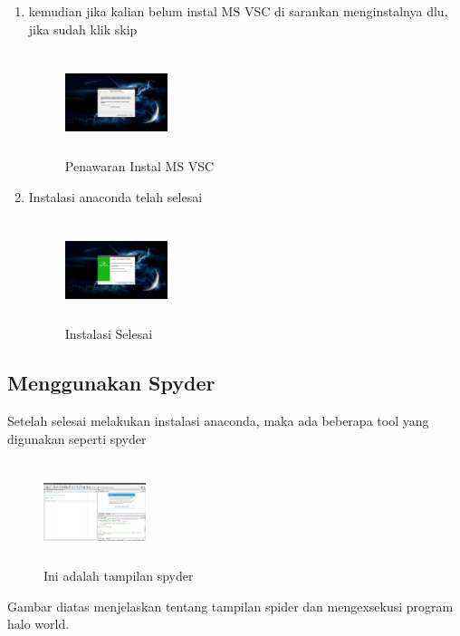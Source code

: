 \begin{enumerate}
    \item kemudian jika kalian belum instal MS VSC di sarankan menginstalnya dlu, jika sudah klik skip
    \begin{figure}[!htbp]
        \centering
        \includegraphics[width=3cm,height=3cm]{figures/Screenshot(87).png}
        \caption{Penawaran Instal MS VSC}
        \label{offering}
        \end{figure}

    \item Instalasi anaconda telah selesai
    \begin{figure}[!htbp]
        \centering
        \includegraphics[width=3cm,height=3cm]{figures/Screenshot(88).png}
        \caption{Instalasi Selesai}
        \label{akhir}
        \end{figure}
\end{enumerate}
\subsection{Menggunakan Spyder}
Setelah selesai melakukan instalasi anaconda, maka ada beberapa tool yang digunakan seperti spyder

\begin{figure}[!htbp]
    \centering
    \includegraphics[width=3cm,height=3cm]{figures/Spyder.png}
    \caption{Ini adalah tampilan spyder}
    \label{spyder}
    \end{figure}

Gambar diatas menjelaskan tentang tampilan spider dan mengexsekusi program halo world.